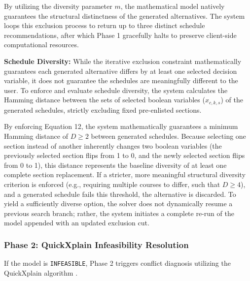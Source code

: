 \documentclass{icsthesis}
\begin{document}
\begin{mainmatter}
		By utilizing the diversity parameter $m$, the mathematical model natively guarantees the structural distinctness of the generated alternatives. The system loops this exclusion process to return up to three distinct schedule recommendations, after which Phase 1 gracefully halts to preserve client-side computational resources.
		
		\textbf{Schedule Diversity:} While the iterative exclusion constraint mathematically guarantees each generated alternative differs by at least one selected decision variable, it does not guarantee the schedules are meaningfully different to the user. To enforce and evaluate schedule diversity, the system calculates the Hamming distance between the sets of selected boolean variables ($x_{c,k,s}$) of the generated schedules, strictly excluding fixed pre-enlisted sections. 
		
		By enforcing Equation 12, the system mathematically guarantees a minimum Hamming distance of $D \geq 2$ between generated schedules. Because selecting one section instead of another inherently changes two boolean variables (the previously selected section flips from 1 to 0, and the newly selected section flips from 0 to 1), this distance represents the baseline diversity of at least one complete section replacement. If a stricter, more meaningful structural diversity criterion is enforced (e.g., requiring multiple courses to differ, such that $D \geq 4$), and a generated schedule fails this threshold, the alternative is discarded. To yield a sufficiently diverse option, the solver does not dynamically resume a previous search branch; rather, the system initiates a complete re-run of the model appended with an updated exclusion cut.
		
		\subsubsection{Phase 2: QuickXplain Infeasibility Resolution}
		
		If the model is \texttt{INFEASIBLE}, Phase 2 triggers conflict diagnosis utilizing the QuickXplain algorithm \citep{junker2004}.
		

\end{mainmatter}
\end{document}
